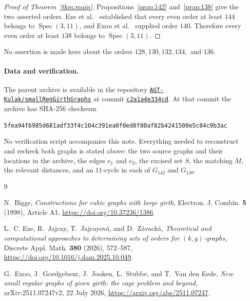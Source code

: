 \documentclass[11pt]{amsart}
\newcommand{\Spec}{\operatorname{Spec}}
\begin{document}
\begin{proof}[Proof of Theorem~\ref{thm:main}]
Propositions~\ref{prop:142} and~\ref{prop:138} give the two asserted
orders. Eze et al.~\cite{EzeEtAl} established that every even order at
least $144$ belongs to $\Spec(3,11)$, and Exoo et al.~\cite{ExooEtAl}
supplied order $140$. Therefore every even order at least $138$ belongs
to $\Spec(3,11)$.
\end{proof}

No assertion is made here about the orders
$128,130,132,134,$ and $136$.

\paragraph{Data and verification.}
The parent archive is available in the repository
\href{https://github.com/AGT-Kulak/smallRegGirthGraphs}%
{\texttt{AGT-Kulak/smallRegGirthGraphs}} at commit
\href{https://github.com/AGT-Kulak/smallRegGirthGraphs/commit/c2a1a4e334cd9f4dd31247f1ebfb6e18c004e4bc}%
{\texttt{c2a1a4e334cd}}. At that commit the archive
 has SHA-256 checksum
\begin{center}
\small\texttt{5fea94f6985d681adf33f4c104c391ea0f0ed8f80af82b4241500e5c84c9b3ac}
\end{center}
No verification script accompanies this note. Everything needed to
reconstruct and recheck both graphs is stated above: the two source
graphs and their locations in the archive, the edges $e_1$ and $e_2$,
the excised set $S$, the matching $M$, the relevant distances, and an
$11$-cycle in each of $G_{142}$ and $G_{138}$.

\begin{thebibliography}{9}

N.~Biggs,
\emph{Constructions for cubic graphs with large girth},
Electron. J. Combin. \textbf{5} (1998), Article A1,
\url{https://doi.org/10.37236/1386}.

L.~C. Eze, R.~Jajcay, T.~Jajcayov\'a, and D.~Z\'avack\'a,
\emph{Theoretical and computational approaches to determining sets of
orders for $(k,g)$-graphs},
Discrete Appl. Math. \textbf{380} (2026), 572--587,
\url{https://doi.org/10.1016/j.dam.2025.10.049}.

G.~Exoo, J.~Goedgebeur, J.~Jooken, L.~Stubbe, and T.~Van den Eede,
\emph{New small regular graphs of given girth: the cage problem and
beyond},
arXiv:2511.07247v2, 22 July 2026,
\url{https://arxiv.org/abs/2511.07247}.

\end{thebibliography}
\end{document}
